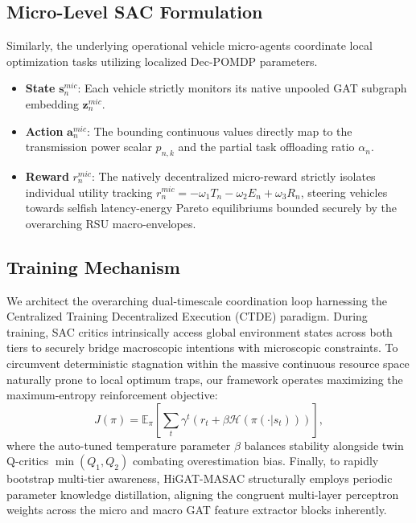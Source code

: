 \subsection{Micro-Level SAC Formulation}
Similarly, the underlying operational vehicle micro-agents coordinate local optimization tasks utilizing localized Dec-POMDP parameters.
\begin{itemize}
    \item \textbf{State} $\mathbf{s}^{mic}_n$: Each vehicle strictly monitors its native unpooled GAT subgraph embedding $\mathbf{z}_n^{mic}$.
    \item \textbf{Action} $\mathbf{a}^{mic}_n$: The bounding continuous values directly map to the transmission power scalar $p_{n,k}$ and the partial task offloading ratio $\alpha_n$.
    \item \textbf{Reward} $r^{mic}_n$: The natively decentralized micro-reward strictly isolates individual utility tracking $r^{mic}_n = - \omega_1 T_n - \omega_2 E_n + \omega_3 R_n$, steering vehicles towards selfish latency-energy Pareto equilibriums bounded securely by the overarching RSU macro-envelopes.
\end{itemize}

\subsection{Training Mechanism}
We architect the overarching dual-timescale coordination loop harnessing the Centralized Training Decentralized Execution (CTDE) paradigm. During training, SAC critics intrinsically access global environment states across both tiers to securely bridge macroscopic intentions with microscopic constraints. To circumvent deterministic stagnation within the massive continuous resource space naturally prone to local optimum traps, our framework operates maximizing the maximum-entropy reinforcement objective:
\begin{equation}
    J(\pi) = \mathbb{E}_{\pi} \left[ \sum_t \gamma^t \left( r_t + \beta \mathcal{H}(\pi(\cdot | s_t)) \right) \right],
\end{equation}
where the auto-tuned temperature parameter $\beta$ balances stability alongside twin Q-critics $\min(Q_1, Q_2)$ combating overestimation bias. Finally, to rapidly bootstrap multi-tier awareness, HiGAT-MASAC structurally employs periodic parameter knowledge distillation, aligning the congruent multi-layer perceptron weights across the micro and macro GAT feature extractor blocks inherently.
